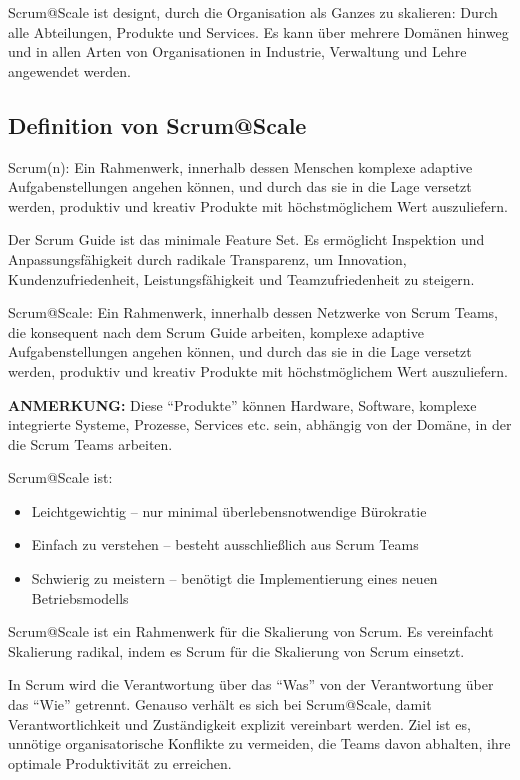 \documentclass[12pt,a4paper,parskip=full]{scrartcl}
\begin{document}
Scrum@Scale ist designt, durch die Organisation als Ganzes zu skalieren: Durch
alle Abteilungen, Produkte und Services. Es kann über mehrere Domänen hinweg
und in allen Arten von Organisationen in Industrie, Verwaltung und Lehre
angewendet werden.

\subsection{Definition von Scrum@Scale}
Scrum(n): Ein Rahmenwerk, innerhalb dessen Menschen komplexe adaptive
Aufgabenstellungen angehen können, und durch das sie in die Lage versetzt
werden, produktiv und kreativ Produkte mit höchstmöglichem Wert auszuliefern.

Der Scrum Guide ist das minimale Feature Set. Es ermöglicht Inspektion und
Anpassungsfähigkeit durch radikale Transparenz, um Innovation,
Kundenzufriedenheit, Leistungsfähigkeit und Teamzufriedenheit zu steigern.

Scrum@Scale: Ein Rahmenwerk, innerhalb dessen Netzwerke von Scrum Teams, die
konsequent nach dem Scrum Guide arbeiten, komplexe adaptive Aufgabenstellungen
angehen können, und durch das sie in die Lage versetzt werden, produktiv und
kreativ Produkte mit höchstmöglichem Wert auszuliefern.

\textbf{ANMERKUNG:} Diese ``Produkte'' können Hardware, Software, komplexe
integrierte Systeme, Prozesse, Services etc. sein, abhängig von der Domäne,
in der die Scrum Teams arbeiten.

Scrum@Scale ist:
\begin{itemize}
\item Leichtgewichtig – nur minimal überlebensnotwendige Bürokratie
\item Einfach zu verstehen – besteht ausschließlich aus Scrum Teams
\item Schwierig zu meistern – benötigt die Implementierung eines neuen Betriebsmodells
\end{itemize}


Scrum@Scale ist ein Rahmenwerk für die Skalierung von Scrum. Es vereinfacht Skalierung radikal, indem es Scrum für die Skalierung von Scrum einsetzt.

In Scrum wird die Verantwortung über das ``Was'' von der Verantwortung über das
``Wie'' getrennt. Genauso verhält es sich bei Scrum@Scale, damit
Verantwortlichkeit und Zuständigkeit explizit vereinbart werden. Ziel ist es,
unnötige organisatorische Konflikte zu vermeiden, die Teams davon abhalten,
ihre optimale Produktivität zu erreichen.
\end{document}
